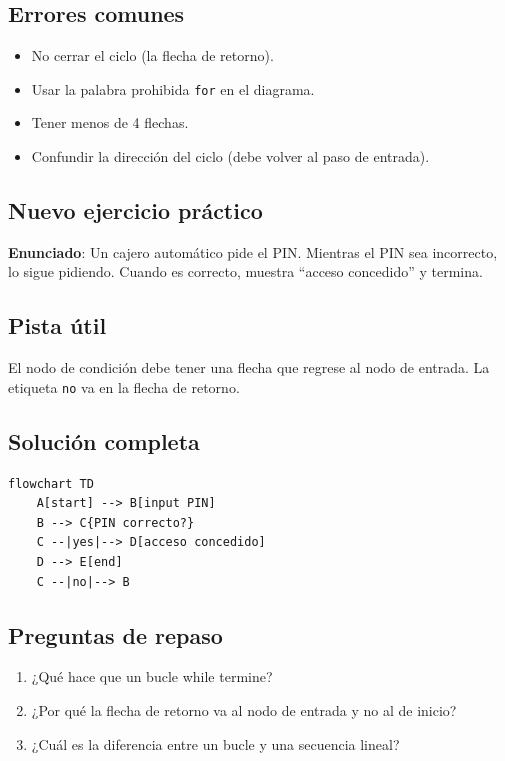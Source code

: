 \documentclass[12pt]{article}
\begin{document}
\subsection{Errores comunes}

\begin{itemize}
    \item No cerrar el ciclo (la flecha de retorno).
    \item Usar la palabra prohibida \texttt{for} en el diagrama.
    \item Tener menos de 4 flechas.
    \item Confundir la dirección del ciclo (debe volver al paso de entrada).
\end{itemize}

\subsection{Nuevo ejercicio práctico}

\textbf{Enunciado}: Un cajero automático pide el PIN. Mientras el PIN sea incorrecto, lo sigue pidiendo. Cuando es correcto, muestra ``acceso concedido'' y termina.

\subsection{Pista útil}

El nodo de condición debe tener una flecha que regrese al nodo de entrada. La etiqueta \texttt{no} va en la flecha de retorno.

\subsection{Solución completa}

\begin{lstlisting}[style=mermaidstyle]
flowchart TD
    A[start] --> B[input PIN]
    B --> C{PIN correcto?}
    C --|yes|--> D[acceso concedido]
    D --> E[end]
    C --|no|--> B
\end{lstlisting}

\subsection{Preguntas de repaso}

\begin{enumerate}
    \item ¿Qué hace que un bucle while termine?
    \item ¿Por qué la flecha de retorno va al nodo de entrada y no al de inicio?
    \item ¿Cuál es la diferencia entre un bucle y una secuencia lineal?
\end{enumerate}
\end{document}
